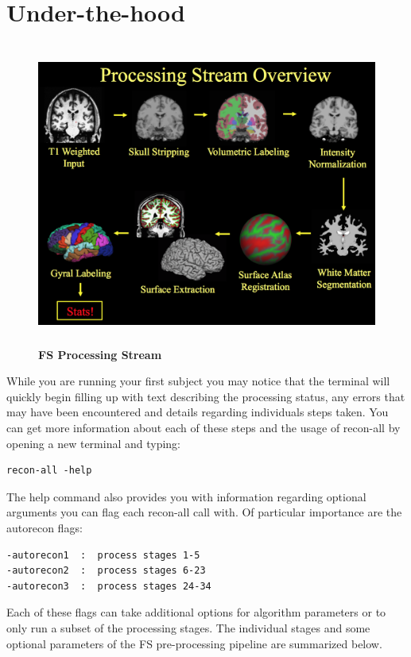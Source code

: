 \documentclass[paper=a4, fontsize=11pt]{scrartcl} %
\numberwithin{equation}{section} %
\numberwithin{figure}{section} %
\numberwithin{table}{section} %
\begin{document}
\section{Under-the-hood}
\begin{figure}[h]
\includegraphics[width=13cm,height=10cm]{FSprocstream}
\caption{\textbf{FS Processing Stream}}
\end{figure}
While you are running your first subject you may notice that the terminal will quickly begin filling up with text describing the processing status, any errors that may have been encountered and details regarding individuals steps taken.  You can get more information about each of these steps and the usage of recon-all by opening a new terminal and typing:
\begin{lstlisting}[frame=single]
recon-all -help
\end{lstlisting}
The help command also provides you with information regarding optional arguments you can flag each recon-all call with.  Of particular importance are the autorecon flags:
\begin{lstlisting}
-autorecon1  :  process stages 1-5
-autorecon2  :  process stages 6-23
-autorecon3  :  process stages 24-34
\end{lstlisting}
Each of these flags can take additional options for algorithm parameters or to only run a subset of the processing stages. The individual stages and some optional parameters of the FS pre-processing pipeline are summarized below.
\end{document}
